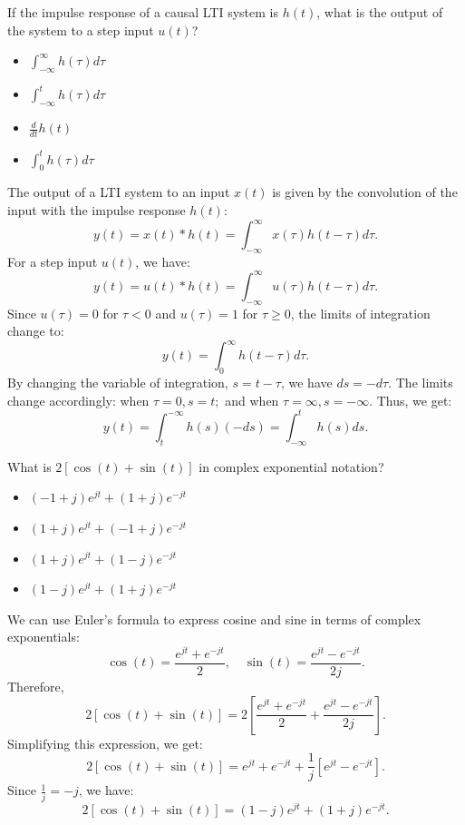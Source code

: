 \begin{popquiz}
    If the impulse response of a causal LTI system is $h(t)$, what is the output of the system to a step input $u(t)$?
    \begin{itemize}
        \item $\int_{-\infty}^{\infty} h(\tau) d\tau$
        \item $\int_{-\infty}^{t} h(\tau) d\tau$
        \item $\frac{d}{dt} h(t)$
        \item $\int_{0}^{t} h(\tau) d\tau$
    \end{itemize}
    \popqsplit
    The output of a LTI system to an input $x(t)$ is given by the convolution of the input with the impulse response $h(t)$:
    \[
    y(t) = x(t) * h(t) = \int_{-\infty}^{\infty} x(\tau) h(t - \tau) d\tau.
    \]
    For a step input $u(t)$, we have:
    \[
    y(t) = u(t) * h(t) = \int_{-\infty}^{\infty} u(\tau) h(t - \tau) d\tau.
    \]
    Since $u(\tau) = 0$ for $\tau < 0$ and $u(\tau) = 1$ for $\tau \geq 0$, the limits of integration change to:
    \[
    y(t) = \int_{0}^{\infty} h(t - \tau) d\tau.
    \]
    By changing the variable of integration, $s = t - \tau$, we have $ds = -d\tau$. The limits change accordingly: when $\tau = 0, s = t;$ and when $\tau = \infty, s = -\infty$. Thus, we get:
    \[
    y(t) = \int_{t}^{-\infty} h(s) (-ds) = \int_{-\infty}^{t} h(s) ds.
    \]

\end{popquiz}
\begin{popquiz}
    What is $2 [\cos(t) + \sin(t)]$ in complex exponential notation?
    \begin{itemize}
      \item $(-1 + j)e^{jt} + (1 + j)e^{-jt}$
      \item $(1 + j)e^{jt} + (-1 + j)e^{-jt}$
      \item $(1 + j)e^{jt} + (1 - j)e^{-jt}$
      \item $(1 - j)e^{jt} + (1 + j)e^{-jt}$
    \end{itemize}
    \popqsplit
    We can use Euler's formula to express cosine and sine in terms of complex exponentials:
    \[
    \cos(t) = \frac{e^{j t} + e^{-j t}}{2}, \quad \sin(t) = \frac{e^{j t} - e^{-j t}}{2j}.
    \]
    Therefore,
    \[
    2 [\cos(t) + \sin(t)] = 2 \left[ \frac{e^{j t} + e^{-j t}}{2} + \frac{e^{j t} - e^{-j t}}{2j} \right].
    \]
    Simplifying this expression, we get:
    \[
    2 [\cos(t) + \sin(t)] = e^{j t} + e^{-j t} + \frac{1}{j} [e^{j t} - e^{-j t}].
    \]
    Since $\frac{1}{j} = -j$, we have:
    \[
    2 [\cos(t) + \sin(t)] = (1 - j)e^{j t} + (1 + j)e^{-j t}.
    \]
\end{popquiz}


